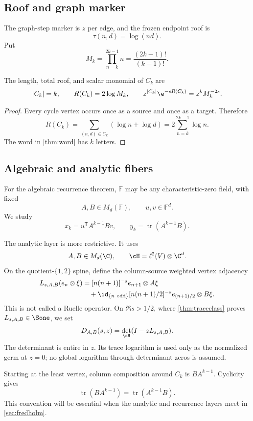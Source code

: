 \subsection{Roof and graph marker}

The graph-step marker is \(z\) per edge, and the frozen endpoint roof is
\[
        \tau(n,d)=\log(nd).
\]
Put
\[
        M_k=\prod_{n=k}^{2k-1}n
            =\frac{(2k-1)!}{(k-1)!}.
\]

\begin{proposition}
\label{prop:monomial}
The length, total roof, and scalar monomial of \(C_k\) are
\[
 |C_k|=k,\qquad
 R(C_k)=2\log M_k,\qquad
 z^{|C_k|}\e^{-sR(C_k)}=z^kM_k^{-2s}.
\]
\end{proposition}

\begin{proof}
Every cycle vertex occurs once as a source and once as a target.  Therefore
\[
 R(C_k)
 =\sum_{(n,d)\in C_k}(\log n+\log d)
 =2\sum_{n=k}^{2k-1}\log n.
\]
The word in \cref{thm:word} has \(k\) letters.
\end{proof}

\subsection{Algebraic and analytic fibers}

For the algebraic recurrence theorem, \(\mathbb F\) may be any
characteristic-zero field, with fixed
\[
        A,B\in M_d(\mathbb F),\qquad u,v\in\mathbb F^d.
\]
We study
\[
 x_k=u^{\mathsf T}A^{k-1}Bv,\qquad
 y_k=\operatorname{tr}(A^{k-1}B).
\]

The analytic layer is more restrictive.  It uses
\[
        A,B\in M_d(\C),\qquad
        \cH=\ell^2(V)\otimes\C^d.
\]
On the quotient-\(\{1,2\}\) spine, define the column-source weighted vertex
adjacency
\[
\begin{aligned}
 L_{s,A,B}(e_n\otimes\xi)
 &=[n(n+1)]^{-s}e_{n+1}\otimes A\xi\\
 &\quad+\id_{\{n\ {\rm odd}\}}
 [n(n+1)/2]^{-s}e_{(n+1)/2}\otimes B\xi.
\end{aligned}
\]
This is not called a Ruelle operator.  On \(\Re s>1/2\), where
\cref{thm:traceclass} proves \(L_{s,A,B}\in\Sone\), we set
\[
        D_{A,B}(s,z)=\det_{\cH}(I-zL_{s,A,B}).
\]
The determinant is entire in \(z\).  Its trace logarithm is used only as the
normalized germ at \(z=0\); no global logarithm through determinant zeros is
assumed.

Starting at the least vertex, column composition around \(C_k\) is
\(BA^{k-1}\).  Cyclicity gives
\[
        \operatorname{tr}(BA^{k-1})
        =\operatorname{tr}(A^{k-1}B).
\]
This convention will be essential when the analytic and recurrence layers
meet in \cref{sec:fredholm}.
